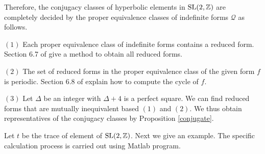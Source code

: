 \documentclass{amsproc}
\theoremstyle{definition}
\theoremstyle{remark}
\numberwithin{equation}{section}
\begin{document}
Therefore, the conjugacy classes of hyperbolic elements in $\rm{SL(2,\mathbb{Z})}$ are completely
decided by the proper equivalence classes of indeﬁnite forms $\mathcal{Q}$ as follows.

$(1)$ Each proper equivalence class of indefinite forms contains a reduced form.
Section 6.7 of \cite{BV} give a method to obtain all reduced forms.

$(2)$ The set of reduced forms in the proper equivalence class of the given form $f$ is periodic.
Section 6.8 of \cite{BV} explain how to compute the cycle of $f$.

$(3)$ Let $\Delta$ be an integer with $\Delta+4$ is a perfect  square. 
We can find reduced forms that are mutually inequivalent based $(1)$ and $(2)$.
We thus obtain representatives of the conjugacy classes by Proposition \ref{conjugate}.



Let $t$ be the trace of element of $\rm{SL(2,\mathbb{Z})}$.
Next we give an example. The specific calculation process is carried out using Matlab program.
\end{document}
